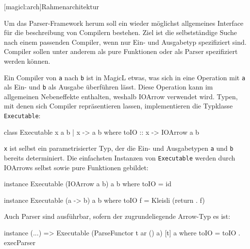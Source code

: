 \documentclass[a4paper, bibgerm]{book}
\newcommand\icode[1]{\lstinline?#1?}
\newcommand\lsection{}
\begin{document}
\lsection[magicl:arch]{Rahmenarchitektur}

Um das Parser-Framework herum soll ein wieder möglichst allgemeines
Interface für die beschreibung von Compilern bestehen. Ziel ist die
selbstständige Suche nach einem passenden Compiler, wenn nur Ein- und
Ausgabetyp spezifiziert sind. Compiler sollen unter anderem als pure
Funktionen oder als Parser spezifiziert werden können.

Ein Compiler von \icode{a} nach \icode{b} ist in MagicL etwas, was sich
in eine Operation mit \icode{a} als Ein- und \icode{b} als Ausgabe
überführen lässt. Diese Operation kann im allgemeinen Nebeneffekte
enthalten, weshalb IOArrow verwendet wird. Typen, mit denen sich
Compiler repräsentieren lassen, implementieren die Typklasse
\icode{Executable}:
\begin{code}
class Executable x a b | x -> a b where
  toIO :: x -> IOArrow a b
\end{code}
\icode{x} ist selbst ein parametrisierter Typ, der die Ein- und
Ausgabetypen \icode{a} und \icode{b} bereits determiniert. Die einfachsten
Instanzen von \icode{Executable} werden durch IOArrows selbst sowie pure
Funktionen gebildet:
\begin{code}
instance Executable (IOArrow a b) a b where
  toIO = id

instance Executable (a -> b) a b where
  toIO f = Kleisli (return . f)
\end{code}
Auch Parser sind ausführbar, sofern der zugrundeliegende Arrow-Typ es
ist:
\begin{code}
instance (...) => Executable (ParseFunctor t ar () a) [t] a where
  toIO = toIO . execParser
\end{code}
\end{document}
